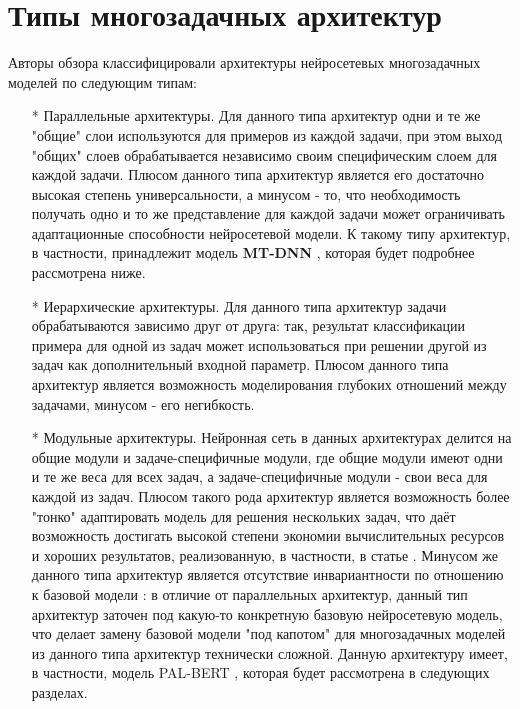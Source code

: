 \section{Типы многозадачных архитектур}
Авторы обзора \cite{Chen_Zhang_Yang_2021} классифицировали архитектуры нейросетевых многозадачных моделей по следующим типам:
\begin{itemize}
\item[*] Параллельные архитектуры. Для данного типа архитектур одни и те же "общие" слои используются для примеров из каждой задачи, при этом выход "общих" слоев обрабатывается независимо своим специфическим слоем для каждой задачи. Плюсом данного типа архитектур является его достаточно высокая степень универсальности, а минусом - то, что необходимость получать одно и то же представление для каждой задачи может ограничивать адаптационные способности нейросетевой модели. К такому типу архитектур, в частности, принадлежит модель \textbf{MT-DNN} \cite{Liu_He_Chen_Gao_2019}, которая будет подробнее рассмотрена ниже. 
\item[*] Иерархические архитектуры. Для данного типа архитектур задачи обрабатываются зависимо друг от друга: так, результат классификации примера для одной из задач может использоваться при решении другой из задач как дополнительный входной параметр. Плюсом данного типа архитектур является возможность моделирования глубоких отношений между задачами, минусом - его негибкость. 
\item[*] Модульные архитектуры. Нейронная сеть в данных архитектурах делится на общие модули и задаче-специфичные модули, где общие модули имеют одни и те же веса для всех задач, а задаче-специфичные модули - свои веса для каждой из задач. Плюсом такого рода архитектур является возможность более "тонко" адаптировать модель для решения нескольких задач, что даёт возможность достигать высокой степени экономии вычислительных ресурсов и хороших результатов, реализованную, в частности, в статье \cite{Maziarka_Danel_2021}. Минусом же данного типа архитектур является отсутствие инвариантности по отношению к базовой модели : в отличие от параллельных архитектур, данный тип архитектур заточен под какую-то конкретную базовую нейросетевую модель, что делает замену базовой модели "под капотом" для многозадачных моделей из данного типа архитектур технически сложной. Данную архитектуру имеет, в частности, модель PAL-BERT  \cite{Stickland_Murray_2019}, которая будет рассмотрена в следующих разделах. 

\end{itemize}
